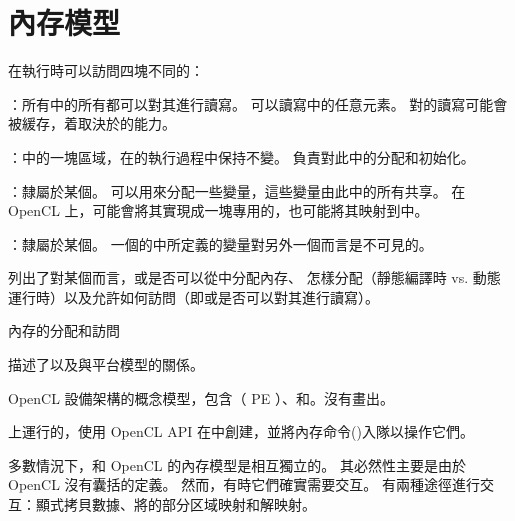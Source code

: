 
\section{內存模型}
在執行時可以訪問四塊不同的：

\startigBase
\item {\ftEmpha {}：}所有中的所有都可以對其進行讀寫。
可以讀寫中的任意元素。
對的讀寫可能會被緩存，着取決於的能力。

\item {\ftEmpha {}：}中的一塊區域，在的執行過程中保持不變。
負責對此中的分配和初始化。

\item {\ftEmpha {}：}隸屬於某個。
可以用來分配一些變量，這些變量由此中的所有共享。
在 OpenCL 上，可能會將其實現成一塊專用的，也可能將其映射到中。

\item {\ftEmpha {}：}隸屬於某個。
一個的中所定義的變量對另外一個而言是不可見的。
\stopigBase

列出了對某個而言，或是否可以從中分配內存、
怎樣分配（靜態編譯時 vs. 動態運行時）以及允許如何訪問（即或是否可以對其進行讀寫）。

\startbuffer[buftblcapmemregion]
內存的分配和訪問
\stopbuffer
{}

描述了以及與平台模型的關係。

\startbuffer[buffigcapopenclarch]
OpenCL 設備架構的概念模型，包含（ PE ）、和。沒有畫出。
\stopbuffer

{}

上運行的，使用 OpenCL API 在中創建，並將內存命令()入隊以操作它們。

多數情況下，和 OpenCL 的內存模型是相互獨立的。
其必然性主要是由於 OpenCL 沒有囊括的定義。
然而，有時它們確實需要交互。
有兩種途徑進行交互：顯式拷貝數據、將的部分区域映射和解映射。

